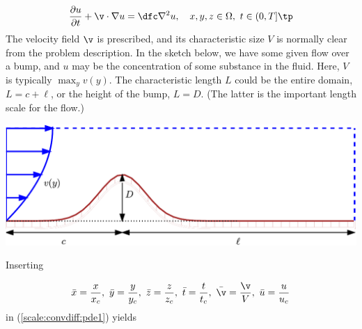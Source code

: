 \documentclass[graybox,envcountchap,sectrefs,final]{svmonodo}
\begin{document}
\begin{equation}
\frac{\partial u}{\partial t} + \v\cdot\nabla u =
\dfc\nabla^2 u,
\quad  x,y, z\in \Omega,\ t\in (0, T]\tp
\label{scale:convdiff:pde1}
\end{equation}
The velocity field $\v$ is prescribed, and its characteristic size $V$
is normally clear from the problem description. In the sketch below,
we have some given flow over a bump, and $u$ may be the concentration
of some substance in the fluid. Here, $V$ is typically $\max_y v(y)$.
The characteristic length $L$ could be the entire domain, $L=c+\ell$,
or the height of the bump, $L=D$. (The latter is the important length
scale for the flow.)



\vspace{3mm}




\vspace{3mm}





\centerline{\includegraphics[width=0.9\linewidth]{fig-scaling/flow_over_gaussian.pdf}}





\vspace{3mm}




\vspace{3mm}



Inserting

\[ \bar x = \frac{x}{x_c},\ \bar y = \frac{y}{y_c},\ \bar z = \frac{z}{z_c},
\ \bar t = \frac{t}{t_c}, \ \bar\v = \frac{\v}{V},
\ \bar u =\frac{u}{u_c}\]
in (\ref{scale:convdiff:pde1}) yields
\end{document}
